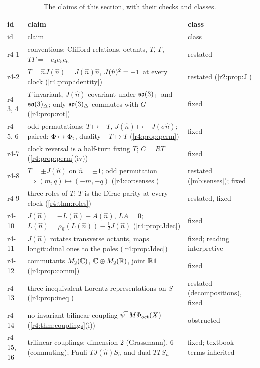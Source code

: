 {\small\renewcommand{\arraystretch}{1.12}
\begin{longtable}{@{}>{\raggedright\arraybackslash}p{}>{\raggedright\arraybackslash}p{}>{\raggedright\arraybackslash}p{}@{}}
\caption{The claims of this section, with their checks and classes.}\label{r4:tab:claims}\\
\toprule
id & claim & class\\
\midrule
\endfirsthead
\toprule
id & claim & class\\
\midrule
\endhead
r4-1 & conventions: Clifford relations, octants, $T$, $\Gamma$, $T\Gamma=-e_4e_5e_6$ & restated\\
r4-2 & $T=\hat nJ(\hat n)=J(\hat n)\hat n$, $J(\hat n)^2=-\mathbf 1$ at every clock (\cref{r4:prop:identity}) & restated (\cref{r2:prop:J})\\
r4-3, 4 & $T$ invariant, $J(\hat n)$ covariant under $\mathfrak{so}(3)_+$ and $\mathfrak{so}(3)_\Delta$; only $\mathfrak{so}(3)_\Delta$ commutes with $G$ (\cref{r4:prop:rot}) & fixed\\
r4-5, 6 & odd permutations: $T\mapsto-T$, $J(\hat n)\mapsto-J(\sigma \hat n)$; paired: $\Phi\mapsto\Phi_{\rm t}$, duality $-T\mapsto T$ (\cref{r4:prop:perm}) & fixed\\
r4-7 & clock reversal is a half-turn fixing $T$; $C=RT$ (\cref{r4:prop:perm}(iv)) & fixed\\
r4-8 & $T=\pm J(\hat n)$ on $\hat n=\pm1$; odd permutation $\Rightarrow(m,q)\mapsto(-m,-q)$ (\cref{r4:cor:senses}) & restated (\cref{mb:senses}); fixed\\
r4-9 & three roles of $T$; $T$ is the Dirac parity at every clock (\cref{r4:thm:roles}) & restated, fixed\\
r4-10 & $J(\hat n)=-L(\hat n)+A(\hat n)$, $LA=0$; $L(\hat n)=\rho_{\hat n}(L(\hat n))-\tfrac12J(\hat n)$ (\cref{r4:prop:Jdec}) & fixed\\
r4-11 & $J(\hat n)$ rotates transverse octants, maps longitudinal ones to the poles (\cref{r4:prop:Jdec}) & fixed; reading interpretive\\
r4-12 & commutants $M_2(\mathbb{C})$, $\mathbb{C}\oplus M_2(\mathbb{R})$, joint $\mathbb{R}\mathbf 1$ (\cref{r4:prop:comm}) & fixed\\
r4-13 & three inequivalent Lorentz representations on $S$ (\cref{r4:prop:ineq}) & restated (decompositions), fixed\\
r4-14 & no invariant bilinear coupling $\psi^{\!\top}M\Phi_{\rm oct}(X)$ (\cref{r4:thm:couplings}(i)) & obstructed\\
r4-15, 16 & trilinear couplings: dimension $2$ (Grassmann), $6$ (commuting); Pauli $TJ(\hat n)S_{\hat n}$ and dual $T\Gamma S_{\hat n}$ & fixed; textbook terms inherited\\

\end{longtable}}
